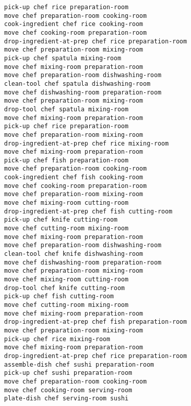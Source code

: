 \documentclass[a4paper,12pt]{article}
\begin{document}
\begin{lstlisting}[language=PDDL, caption=Plan for Problem 1]
pick-up chef rice preparation-room 
move chef preparation-room cooking-room 
cook-ingredient chef rice cooking-room 
move chef cooking-room preparation-room 
drop-ingredient-at-prep chef rice preparation-room 
move chef preparation-room mixing-room 
pick-up chef spatula mixing-room 
move chef mixing-room preparation-room 
move chef preparation-room dishwashing-room 
clean-tool chef spatula dishwashing-room 
move chef dishwashing-room preparation-room 
move chef preparation-room mixing-room 
drop-tool chef spatula mixing-room 
move chef mixing-room preparation-room 
pick-up chef rice preparation-room 
move chef preparation-room mixing-room 
drop-ingredient-at-prep chef rice mixing-room 
move chef mixing-room preparation-room 
pick-up chef fish preparation-room 
move chef preparation-room cooking-room 
cook-ingredient chef fish cooking-room 
move chef cooking-room preparation-room 
move chef preparation-room mixing-room 
move chef mixing-room cutting-room 
drop-ingredient-at-prep chef fish cutting-room 
pick-up chef knife cutting-room 
move chef cutting-room mixing-room 
move chef mixing-room preparation-room 
move chef preparation-room dishwashing-room 
clean-tool chef knife dishwashing-room 
move chef dishwashing-room preparation-room 
move chef preparation-room mixing-room 
move chef mixing-room cutting-room 
drop-tool chef knife cutting-room 
pick-up chef fish cutting-room 
move chef cutting-room mixing-room 
move chef mixing-room preparation-room 
drop-ingredient-at-prep chef fish preparation-room 
move chef preparation-room mixing-room 
pick-up chef rice mixing-room 
move chef mixing-room preparation-room 
drop-ingredient-at-prep chef rice preparation-room 
assemble-dish chef sushi preparation-room 
pick-up chef sushi preparation-room 
move chef preparation-room cooking-room 
move chef cooking-room serving-room 
plate-dish chef serving-room sushi
\end{lstlisting}
\end{document}
